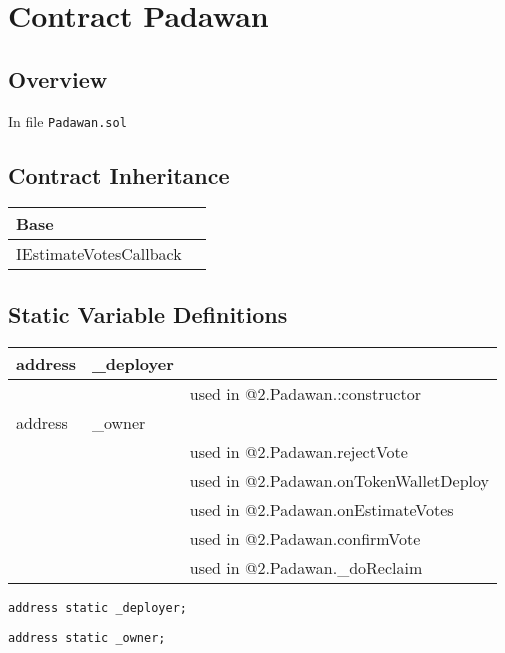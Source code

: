 
\chapter{Contract Padawan}

\minitoc

\section{Overview}


In file {\tt Padawan.sol}

\section{Contract Inheritance}


\noindent\begin{tabular}{|l|p{5cm}|}\hline
Base & \\\hline
IEstimateVotesCallback & \\\hline
\end{tabular}


\section{Static Variable Definitions}


\ifsoltables
\noindent\begin{tabular}{|l|l|p{5cm}|}\hline
address & \_{}deployer &  \\\hline
 & & used in @2.Padawan.:constructor\\\hline
address & \_{}owner &  \\\hline
 & & used in @2.Padawan.rejectVote\\\hline
 & & used in @2.Padawan.onTokenWalletDeploy\\\hline
 & & used in @2.Padawan.onEstimateVotes\\\hline
 & & used in @2.Padawan.confirmVote\\\hline
 & & used in @2.Padawan.\_{}doReclaim\\\hline
\end{tabular}
\fi


\begin{lstlisting}[firstnumber=32]
    address static _deployer;
\end{lstlisting}

\begin{lstlisting}[firstnumber=33]
    address static _owner;
\end{lstlisting}

